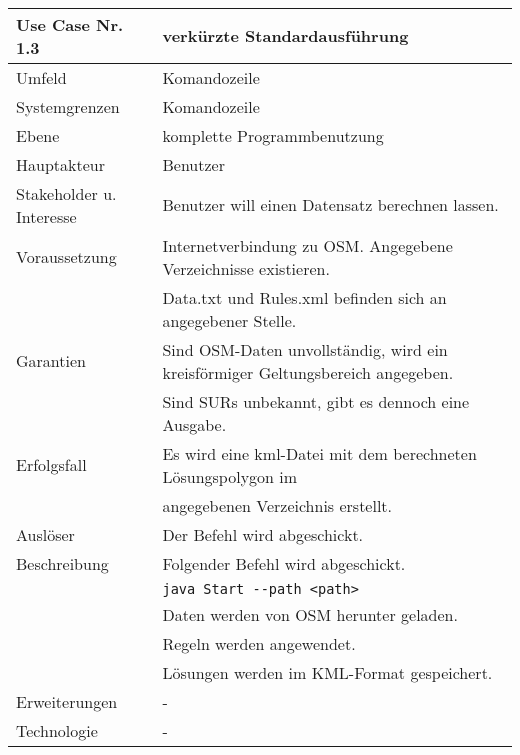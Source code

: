 \\[12pt]
\begin{tabular}{| l | l |}
 \hline
 \textbf{Use Case Nr. 1.3} & verkürzte Standardausführung\\
 \hline
 Umfeld & Komandozeile\\
 \hline
 Systemgrenzen & Komandozeile\\
 \hline
 Ebene & komplette Programmbenutzung\\
 \hline
 Hauptakteur & Benutzer\\
 \hline
 Stakeholder u. Interesse & Benutzer will einen Datensatz berechnen lassen.\\
 \hline
 Voraussetzung & Internetverbindung zu OSM. Angegebene Verzeichnisse existieren.\\
	      & Data.txt und Rules.xml befinden sich an angegebener Stelle. \\
 \hline
 Garantien & Sind OSM-Daten unvollständig, wird ein kreisförmiger Geltungsbereich angegeben.\\
	  & Sind SURs unbekannt, gibt es dennoch eine Ausgabe.\\
 \hline
 Erfolgsfall & Es wird eine kml-Datei mit dem berechneten Lösungspolygon im\\
	    & angegebenen Verzeichnis erstellt.\\
 \hline
 Auslöser & Der Befehl wird abgeschickt.\\
 \hline
 Beschreibung & Folgender Befehl wird abgeschickt.\\
	    & \verb|java Start --path <path>|\\
	    & Daten werden von OSM herunter geladen.\\
	    & Regeln werden angewendet.\\
	    & Lösungen werden im KML-Format gespeichert.\\
 \hline
 Erweiterungen & -\\
 \hline
 Technologie & -\\
 \hline
\end{tabular}
\\[12pt]
